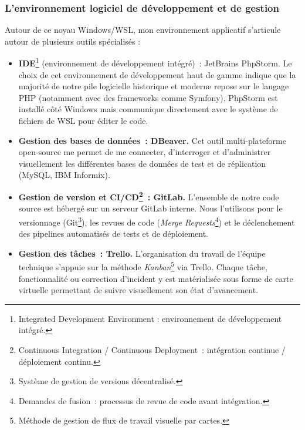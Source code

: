 \subsubsection*{L'environnement logiciel de développement et de gestion}

Autour de ce noyau Windows/WSL, mon environnement applicatif s'articule autour de plusieurs outils spécialisés :

\begin{itemize}
    \item \textbf{IDE}\footnote{Integrated Development Environment : environnement de développement intégré.} (environnement de développement intégré)~: JetBrains PhpStorm. Le choix de cet environnement de développement haut de gamme indique que la majorité de notre pile logicielle historique et moderne repose sur le langage PHP (notamment avec des frameworks comme Symfony). PhpStorm est installé côté Windows mais communique directement avec le système de fichiers de WSL pour éditer le code.
    \item \textbf{Gestion des bases de données~: DBeaver.} Cet outil multi-plateforme open-source me permet de me connecter, d'interroger et d'administrer visuellement les différentes bases de données de test et de réplication (MySQL, IBM Informix).
    \item \textbf{Gestion de version et CI/CD\footnote{Continuous Integration / Continuous Deployment~: intégration continue / déploiement continu.}~: GitLab.} L'ensemble de notre code source est hébergé sur un serveur GitLab interne. Nous l'utilisons pour le versionnage (Git\footnote{Système de gestion de versions décentralisé.}), les revues de code (\textit{Merge Requests}\footnote{Demandes de fusion~: processus de revue de code avant intégration.}) et le déclenchement des pipelines automatisés de tests et de déploiement.
    \item \textbf{Gestion des tâches~: Trello.} L'organisation du travail de l'équipe technique s'appuie sur la méthode \textit{Kanban}\footnote{Méthode de gestion de flux de travail visuelle par cartes.} via Trello. Chaque tâche, fonctionnalité ou correction d'incident y est matérialisée sous forme de carte virtuelle permettant de suivre visuellement son état d'avancement.
\end{itemize}
